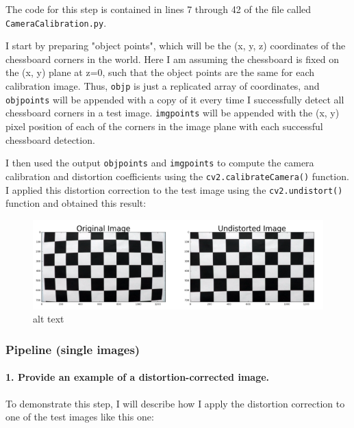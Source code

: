 \documentclass[11pt]{article}
\makeatletter
\def\maxwidth{\ifdim\Gin@nat@width>\linewidth\linewidth
    \else\Gin@nat@width\fi}
\let\Oldincludegraphics\includegraphics
\renewcommand{\includegraphics}[1]{\Oldincludegraphics[width=.8\maxwidth]{#1}}
\makeatother
\begin{document}
The code for this step is contained in lines 7 through 42 of the file
called \texttt{CameraCalibration.py}.

I start by preparing "object points", which will be the (x, y, z)
coordinates of the chessboard corners in the world. Here I am assuming
the chessboard is fixed on the (x, y) plane at z=0, such that the object
points are the same for each calibration image. Thus, \texttt{objp} is
just a replicated array of coordinates, and \texttt{objpoints} will be
appended with a copy of it every time I successfully detect all
chessboard corners in a test image. \texttt{imgpoints} will be appended
with the (x, y) pixel position of each of the corners in the image plane
with each successful chessboard detection.

I then used the output \texttt{objpoints} and \texttt{imgpoints} to
compute the camera calibration and distortion coefficients using the
\texttt{cv2.calibrateCamera()} function. I applied this distortion
correction to the test image using the \texttt{cv2.undistort()} function
and obtained this result:

\begin{figure}
\centering
\includegraphics{./examples/undistort_output.png}
\caption{alt text}
\end{figure}

\subsubsection{Pipeline (single images)}\label{pipeline-single-images}

\paragraph{1. Provide an example of a distortion-corrected
image.}\label{provide-an-example-of-a-distortion-corrected-image.}

To demonstrate this step, I will describe how I apply the distortion
correction to one of the test images like this one:
\end{document}
